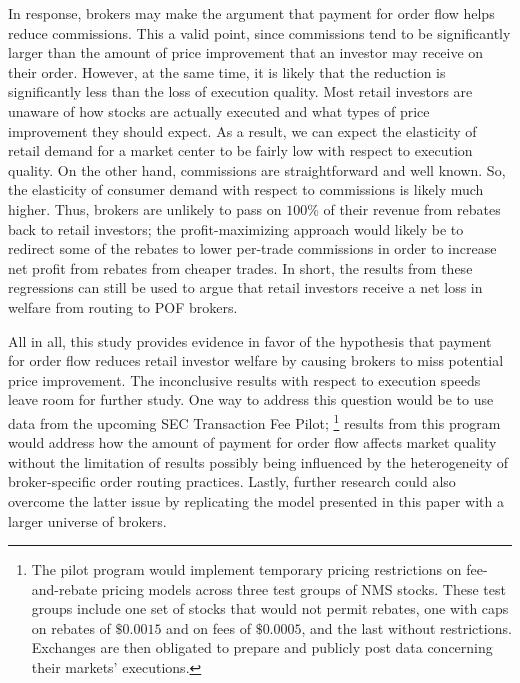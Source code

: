 \documentclass[12pt,a4paper]{article}
\begin{document}
In response, brokers may make the argument that payment for order flow helps reduce
commissions. This a valid point, since commissions tend to be significantly larger than
the amount of price improvement that an investor may receive on their order. However, at
the same time, it is likely that the reduction is significantly less than the loss of execution
quality. Most retail investors are unaware of how stocks are actually executed and what
types of price improvement they should expect. As a result, we can expect the elasticity
of retail demand for a market center to be fairly low with respect to execution quality.
On the other hand, commissions are straightforward and well known. So, the elasticity
of consumer demand with respect to commissions is likely much higher. Thus, brokers
are unlikely to pass on $100\%$ of their revenue from rebates back to retail investors; the profit-maximizing approach would likely be to redirect some of the rebates to lower per-trade commissions in order to increase net profit from rebates from cheaper trades. In short,
the results from these regressions can still be used to argue that retail investors receive a
net loss in welfare from routing to POF brokers.


All in all, this study provides evidence in favor of the hypothesis that payment for order flow reduces retail investor welfare by causing brokers to miss potential price improvement. The inconclusive results with respect to execution speeds leave room for further study. One way to address this question would be to use data from the upcoming SEC Transaction Fee Pilot;
\footnote{ The pilot program would implement temporary pricing restrictions on fee-and-rebate pricing models across three test groups of NMS stocks. These test groups include one set of stocks that would not permit rebates, one with caps on rebates of $\$0.0015$ and on fees of $\$0.0005$, and the last without restrictions. Exchanges are then obligated to prepare and publicly post data concerning their markets' executions. 
}
results from this program would address how the amount of payment for order flow affects market quality without the limitation of results possibly being influenced by the heterogeneity of broker-specific order routing practices. Lastly, further research could also overcome the latter issue by replicating the model presented in this paper with a larger universe of brokers. 







\pagebreak
\end{document}
